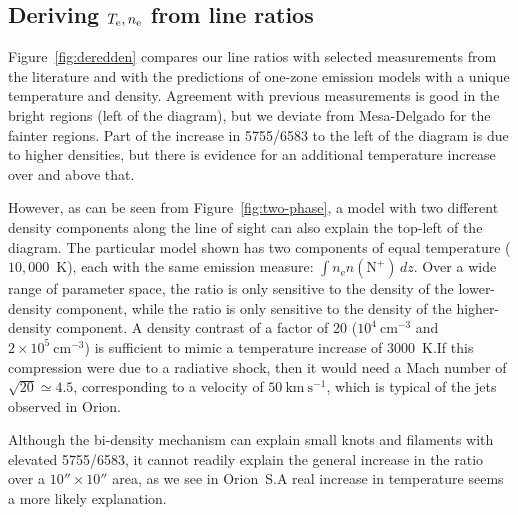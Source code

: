 \documentclass[preprint]{aastex}
\begin{document}
\subsection{\boldmath Deriving \(T_{\mathrm{e}}, n_{\mathrm{e}}\) from line ratios}
\label{sec:derive}

Figure~\ref{fig:deredden} compares our line ratios with selected
measurements from the literature and with the predictions of one-zone
emission models with a unique temperature and density.  Agreement with
previous measurements is good in the bright regions (left of the
diagram), but we deviate from Mesa-Delgado for the fainter regions.
Part of the increase in 5755/6583 to the left of the diagram is due to
higher densities, but there is evidence for an additional temperature
increase over and above that.

However, as can be seen from Figure~\ref{fig:two-phase}, a model with
two different density components along the line of sight can also
explain the top-left of the diagram.  The particular model shown has
two components of equal temperature (\(10,000\)~K), each with the same
emission measure: \(\int n_{\mathrm{e}} n(\mathrm{N^+}) \, dz\).  Over
a wide range of parameter space, the \sii{} ratio is only sensitive to
the density of the lower-density component, while the \nii{} ratio is
only sensitive to the density of the higher-density component.  A
density contrast of a factor of 20 (\(10^4~\mathrm{cm^{-3}}\) and
\(2 \times 10^5~\mathrm{cm^{-3}}\)) is sufficient to mimic a temperature
increase of \(3000\)~K.\@   If this compression were due to a
radiative shock, then it would need a Mach number of \(\sqrt{20}
\simeq 4.5\), corresponding to a velocity of \(50~\mathrm{km\
  s^{-1}}\), which is typical of the jets observed in Orion. 

Although the bi-density mechanism can explain small knots and
filaments with elevated 5755/6583, it cannot readily explain the
general increase in the ratio over a \(10'' \times 10''\) area, as we
see in Orion~S.\@  A real increase in temperature seems a more likely
explanation.  
\end{document}
